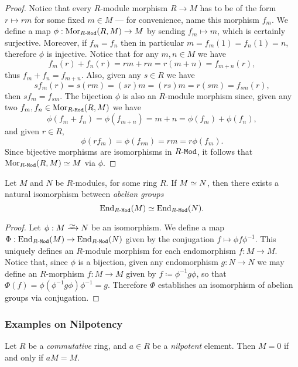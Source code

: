 \begin{proof}
Notice that every \(R\)-module morphism \(R \to M\) has to be of the form
\(r \mapsto r m\) for some fixed \(m \in M\) --- for convenience, name this
morphism \(f_m\). We define a map \(\phi: \operatorname{Mor}_{{R\text{-}\texttt{Mod}}}(R, M) \to M\) by
sending \(f_m \mapsto m\), which is certainly surjective. Moreover, if
\(f_m = f_n\) then in particular \(m = f_m(1) = f_n(1) = n\), therefore \(\phi\)
is injective. Notice that for any \(m, n \in M\) we have
\[
f_m(r) + f_n(r) = r m + r n = r(m + n) = f_{m + n}(r),
\]
thus \(f_m + f_n = f_{m + n}\). Also, given any \(s \in R\) we have
\[
s f_m(r) = s (r m) = (s r) m = (r s) m = r (s m) = f_{s m}(r),
\]
then \(s f_m = f_{s m}\).  The bijection \(\phi\) is also an \(R\)-module
morphism since, given any two \(f_m, f_n \in \operatorname{Mor}_{{R\text{-}\texttt{Mod}}}(R, M)\) we have
\[
\phi(f_m + f_n) = \phi(f_{m + n}) = m + n = \phi(f_m) + \phi(f_n),
\]
and given \(r \in R\),
\[
\phi(r f_m) = \phi(f_{r m}) = r m = r \phi(f_m).
\]
Since bijective morphisms are isomorphisms in \({R\text{-}\texttt{Mod}}\), it follows that
\(\operatorname{Mor}_{{R\text{-}\texttt{Mod}}}(R, M) \simeq M\) via \(\phi\).
\end{proof}

\begin{proposition}
\label{prop:M-iso-N-then-iso-between-End}
Let \(M\) and \(N\) be \(R\)-modules, for some ring \(R\). If \(M \simeq N\), then
there exists a natural isomorphism between \emph{abelian groups}
\[
\operatorname{End}_{{R\text{-}\texttt{Mod}}}(M) \simeq \operatorname{End}_{{R\text{-}\texttt{Mod}}}(N).
\]
\end{proposition}

\begin{proof}
Let \(\phi: M \isoto N\) be an isomorphism. We define a map
\(\Phi: \operatorname{End}_{{R\text{-}\texttt{Mod}}}(M) \to \operatorname{End}_{{R\text{-}\texttt{Mod}}}(N)\) given by the conjugation \(f
\mapsto \phi f \phi^{-1}\). This uniquely defines an \(R\)-module morphism for
each endomorphism \(f: M \to M\). Notice that, since \(\phi\) is a bijection,
given any endomorphism \(g: N \to N\) we may define an \(R\)-morphism \(f: M \to
M\) given by \(f \coloneq \phi^{-1} g \phi\), so that \(\Phi(f) = \phi
(\phi^{-1} g \phi) \phi^{-1} = g\). Therefore \(\Phi\) establishes an isomorphism
of abelian groups via conjugation.
\end{proof}

\subsubsection{Examples on Nilpotency}

\begin{lemma}
\label{lem:nakayama-particular-case}
Let \(R\) be a \emph{commutative} ring, and \(a \in R\) be a \emph{nilpotent}
element. Then \(M = 0\) if and only if \(a M = M\).
\end{lemma}

